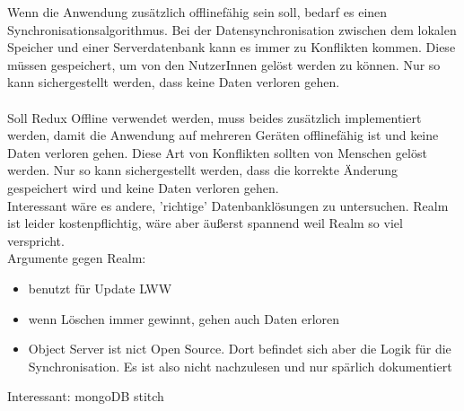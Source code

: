Wenn die Anwendung zusätzlich offlinefähig sein soll, bedarf es einen Synchronisationsalgorithmus.
Bei der Datensynchronisation zwischen dem lokalen Speicher und einer Serverdatenbank kann es immer zu Konflikten kommen.
Diese müssen gespeichert, um von den NutzerInnen gelöst werden zu können. Nur so kann sichergestellt werden, dass keine Daten verloren gehen.\\\\
% 
Soll Redux Offline verwendet werden, muss beides zusätzlich implementiert werden, damit die Anwendung auf mehreren Geräten offlinefähig ist und keine Daten verloren gehen.
Diese Art von Konflikten sollten von Menschen gelöst werden. Nur so kann sichergestellt werden, dass die korrekte Änderung gespeichert wird und keine Daten verloren gehen.\\

% 
% 
% 
Interessant wäre es andere, 'richtige' Datenbanklösungen zu untersuchen. 
Realm ist leider kostenpflichtig, wäre aber äußerst spannend weil Realm so viel verspricht.\\
Argumente gegen Realm:
\begin{itemize}
  \item benutzt für Update LWW
  \item wenn Löschen immer gewinnt, gehen auch Daten erloren
  \item Object Server ist nict Open Source. Dort befindet sich aber die Logik für die Synchronisation. Es ist also nicht nachzulesen und nur spärlich dokumentiert
\end{itemize}
% 
% 
% 
Interessant: mongoDB stitch ~\cite{stitch}